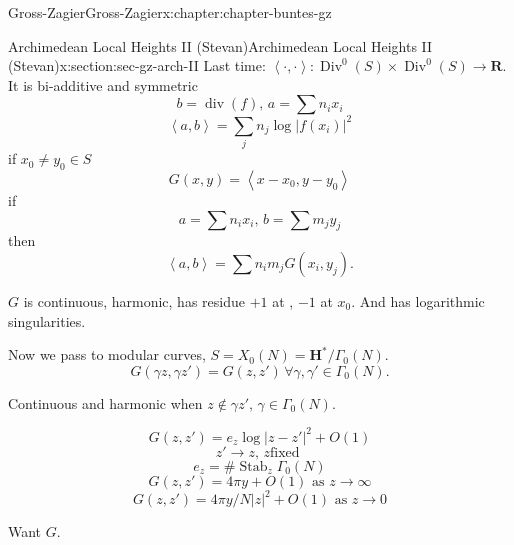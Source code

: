 \documentclass[oneside,10pt,]{book}
\numberwithin{equation}{section}
\newcommand{\pair}[2]{\left\langle #1, #2 \right\rangle}
\newcommand{\RR}{\mathbf{R}}
\newcommand{\HH}{\mathbf{H}}
\DeclareMathOperator{\divisor}{div}
\DeclareMathOperator{\Div}{Div}
\DeclareMathOperator{\Stab}{Stab}
\begin{document}
\begin{chapterptx}{Gross-Zagier}{}{Gross-Zagier}{}{}{x:chapter:chapter-buntes-gz}
\typeout{************************************************}
%
\begin{sectionptx}{Archimedean Local Heights II (Stevan)}{}{Archimedean Local Heights II (Stevan)}{}{}{x:section:sec-gz-arch-II}
Last time: \(\pair \cdot\cdot \colon \Div^0(S) \times \Div^0(S) \to \RR\). It is bi-additive and symmetric%
\begin{equation*}
b   = \divisor(f),\,a = \sum n_i x_i
\end{equation*}
%
\begin{equation*}
\pair ab = \sum_j n_j \log|f(x_i)|^2
\end{equation*}
if \(x_0\ne y_0 \in S\)%
\begin{equation*}
G(x,y) = \pair{x-x_0}{y-y_0}
\end{equation*}
if%
\begin{equation*}
a =\sum n_ix_i,\,b = \sum m_j y_j
\end{equation*}
then%
\begin{equation*}
\pair a b = \sum n_im_j G(x_i,y_j)\text{.}
\end{equation*}
%
\par
\(G \) is continuous, harmonic, has residue \(+1\) at \(\), \(-1\) at \(x_0\). And has logarithmic singularities.%
\par
Now we pass to modular curves, \(S = X_0(N) = \HH^*/\Gamma _0(N)\).%
\begin{equation*}
G(\gamma z,\gamma z') = G(z,z') \,\forall \gamma ,\gamma ' \in \Gamma _0(N)\text{.}
\end{equation*}
%
\par
Continuous and harmonic when \(z \not \in \gamma  z',\,\gamma \in \Gamma _0(N)\).%
\par
%
\begin{equation*}
G(z,z')= e_z\log|z-z'|^2 + O(1)
\end{equation*}
%
\begin{equation*}
z'\to z,\,z\text{fixed }
\end{equation*}
%
\begin{equation*}
e_z =\#\Stab_z \Gamma _0(N)
\end{equation*}
%
\begin{equation*}
G(z,z') = 4 \pi  y +O(1) \text{ as } z\to \infty 
\end{equation*}
%
\begin{equation*}
G(z,z') = 4 \pi  y/N|z|^2 +O(1) \text{ as } z\to 0
\end{equation*}
%
\par
Want \(G\).%

\end{sectionptx}
\end{chapterptx}
\end{document}
